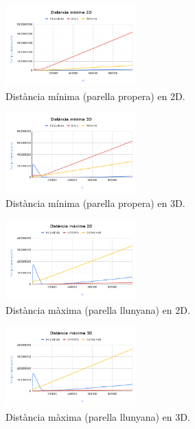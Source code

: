 \documentclass{ieeetj}
\begin{document}
\begin{figure}[H]
    \centerline{\includegraphics[width=0.45\textwidth]{docs/png/Distància mínima 2D.png}}
    \caption{Distància mínima (parella propera) en 2D.}
    \label{fig:distMin}
\end{figure}

\begin{figure}[h]
    \centerline{\includegraphics[width=0.45\textwidth]{docs/png/Distància mínima 3D.png}}
    \caption{Distància mínima (parella propera) en 3D.}
    \label{fig:distMin}
\end{figure}


\begin{figure}[H]
    \centerline{\includegraphics[width=0.45\textwidth]{docs/png/Distància màxima 2D.png}}
    \caption{Distància màxima (parella llunyana) en 2D.}
    \label{fig:distMin}
\end{figure}

\begin{figure}[h]
    \centerline{\includegraphics[width=0.45\textwidth]{docs/png/Distància màxima 3D.png}}
    \caption{Distància màxima (parella llunyana) en 3D.}
    \label{fig:distMin}
\end{figure}
\end{document}
